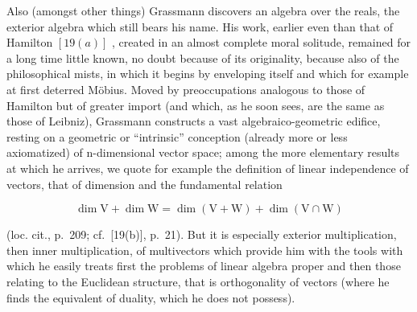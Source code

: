 Also (amongst other things) Grassmann discovers an algebra over the reals, the exterior algebra which still bears his name. His work, earlier even than that of Hamilton \([19(a)]\) , created in an almost complete moral solitude, remained for a long time little known, no doubt because of its originality, because also of the philosophical mists, in which it begins by enveloping itself and which for example at first deterred Möbius. Moved by preoccupations analogous to those of Hamilton but of greater import (and which, as he soon sees, are the same as those of Leibniz), Grassmann constructs a vast algebraico-geometric edifice, resting on a geometric or ``intrinsic'' conception (already more or less axiomatized) of n-dimensional vector space; among the more elementary results at which he arrives, we quote for example the definition of linear independence of vectors, that of dimension and the fundamental relation

\[
\dim \mathrm{V} + \dim \mathrm{W} = \dim (\mathrm{V} + \mathrm{W}) + \dim (\mathrm{V} \cap \mathrm{W})
\]

(loc. cit., p.~209; cf.~{[}19(b){]}, p.~21). But it is especially exterior multiplication, then inner multiplication, of multivectors which provide him with the tools with which he easily treats first the problems of linear algebra proper and then those relating to the Euclidean structure, that is orthogonality of vectors (where he finds the equivalent of duality, which he does not possess).

